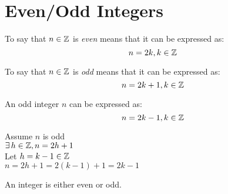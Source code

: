 \documentclass[letterpaper,12pt,fleqn]{article}
\begin{document}
\section*{Even/Odd Integers}

\begin{definition}
  To say that $n\in\mathbb{Z}$ is \emph{even} means that it can be expressed as:
  \[n=2k,k\in\mathbb{Z}\]

  To say that $n\in\mathbb{Z}$ is \emph{odd} means that it can be expressed as:
  \[n=2k+1,k\in\mathbb{Z}\]
\end{definition}

\begin{theorem}
  An odd integer $n$ can be expressed as:
  \[n=2k-1,k\in\mathbb{Z}\]
\end{theorem}

\begin{theproof}
  Assume $n$ is odd \\
  $\exists\,h\in\mathbb{Z},n=2h+1$ \\
  Let $h=k-1\in\mathbb{Z}$ \\
  $n=2h+1=2(k-1)+1=2k-1$ \\
\end{theproof}

\begin{theorem}
  An integer is either even or odd.
\end{theorem}
\end{document}
